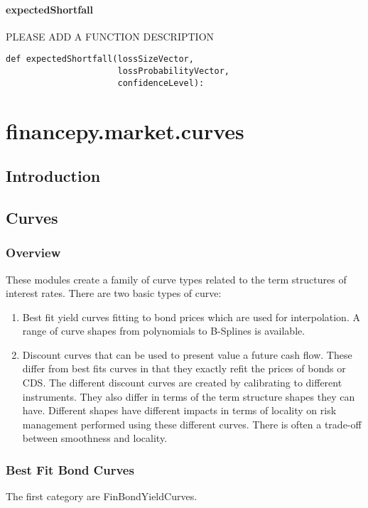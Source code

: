 \documentclass[twoside,11pt]{book}
\begin{document}
\subsubsection*{{\bf expectedShortfall}}
PLEASE ADD A FUNCTION DESCRIPTION

\begin{lstlisting}
def expectedShortfall(lossSizeVector,
                      lossProbabilityVector,
                      confidenceLevel):
\end{lstlisting}


\chapter{financepy.market.curves}
\section{Introduction}


\section*{Curves}

\subsection*{Overview}
These modules create a family of curve types related to the term structures of interest rates. There are two basic types of curve:

\begin{enumerate}
\item{ Best fit yield curves fitting to bond prices which are used for interpolation. A range of curve shapes from polynomials to B-Splines is available.
}
\item{ Discount curves that can be used to present value a future cash flow. These differ from best fits curves in that they exactly refit the prices of bonds or CDS. The different discount curves are created by calibrating to different instruments. They also differ in terms of the term structure shapes they can have. Different shapes have different impacts in terms of locality on risk management performed using these different curves. There is often a trade-off between smoothness and locality.
}
\end{enumerate}


\subsection*{Best Fit Bond Curves}
The first category are FinBondYieldCurves.
\end{document}
